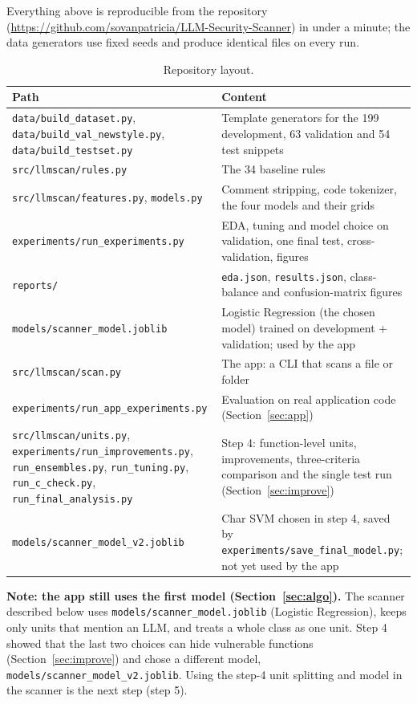 \documentclass[11pt,a4paper]{article}
\newcommand{\code}[1]{\texttt{#1}}
\begin{document}
Everything above is reproducible from the repository
(\url{https://github.com/sovanpatricia/LLM-Security-Scanner}) in under a minute; the data
generators use fixed seeds and produce identical files on every run.

\begin{table}[H]
\centering\small
\begin{tabularx}{\linewidth}{>{\raggedright\arraybackslash}p{6.4cm} >{\raggedright\arraybackslash}X}
\toprule
Path & Content \\
\midrule
\code{data/build\_dataset.py}, \code{data/build\_val\_newstyle.py}, \code{data/build\_testset.py} & Template generators for the 199 development, 63 validation and 54 test snippets \\
\code{src/llmscan/rules.py} & The 34 baseline rules \\
\code{src/llmscan/features.py}, \code{models.py} & Comment stripping, code tokenizer, the four models and their grids \\
\code{experiments/run\_experiments.py} & EDA, tuning and model choice on validation, one final test, cross-validation, figures \\
\code{reports/} & \code{eda.json}, \code{results.json}, class-balance and confusion-matrix figures \\
\code{models/scanner\_model.joblib} & Logistic Regression (the chosen model) trained on development + validation; used by the app \\
\code{src/llmscan/scan.py} & The app: a CLI that scans a file or folder \\
\code{experiments/run\_app\_experiments.py} & Evaluation on real application code (Section~\ref{sec:app}) \\
\code{src/llmscan/units.py}, \code{experiments/run\_improvements.py}, \code{run\_ensembles.py}, \code{run\_tuning.py}, \code{run\_c\_check.py}, \code{run\_final\_analysis.py} & Step 4: function-level units, improvements, three-criteria comparison and the single test run (Section~\ref{sec:improve}) \\
\code{models/scanner\_model\_v2.joblib} & Char SVM chosen in step 4, saved by \code{experiments/save\_final\_model.py}; not yet used by the app \\
\bottomrule
\end{tabularx}
\caption{Repository layout.}
\end{table}

\textbf{Note: the app still uses the first model (Section~\ref{sec:algo}).} The scanner described below uses
\code{models/scanner\_model.joblib} (Logistic Regression), keeps only units that mention
an LLM, and treats a whole class as one unit. Step 4 showed that the last two choices can
hide vulnerable functions (Section~\ref{sec:improve}) and chose a different model,
\code{models/scanner\_model\_v2.joblib}. Using the step-4 unit splitting and model in the
scanner is the next step (step 5).
\end{document}
